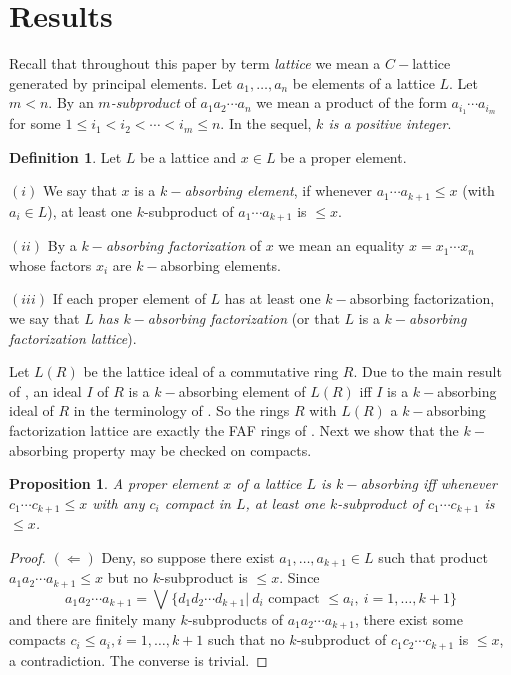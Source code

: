 \documentclass{amsart}
\theoremstyle{plain}
\newtheorem{proposition}[theorem]{Proposition}
\theoremstyle{definition}
\newtheorem{definition}[theorem]{Definition}
\theoremstyle{remark}
\begin{document}
\section{Results}



Recall that throughout this paper by term {\em lattice} we mean   a $C-$lattice generated by principal elements. 
Let $a_1, \ldots , a_{n}$ be elements of a lattice $L$.
Let $m<n$. By an {\em $m$-subproduct} of $a_1a_2\cdots a_{n}$ we mean a product of the form $a_{i_1}\cdots a_{i_m}$ for some  
$1\leq i_1< i_2< \cdots <i_m\leq n$. In the sequel, 
{\em $k$ is a positive integer}.

\begin{definition}\label{30}
Let $L$ be a lattice and $x\in L$ be a proper  element.

$(i)$ We say that $x$ is   a {\em $k-$absorbing element}, if whenever $a_1\cdots a_{k+1}\leq x$ (with  $a_i\in L$),  at least one 
$k$-subproduct of $a_1\cdots a_{k+1}$ is  $\leq x$.

$(ii)$ By a {\em $k-$absorbing factorization} of $x$ we mean an equality $x=x_1\cdots x_{n}$   whose factors $x_i$ are $k-$absorbing elements.

$(iii)$ If each proper element  of $L$ has at least one 
 $k-$absorbing factorization, we say that $L$ 
 {\em has $k-$absorbing factorization} (or that $L$ is a {\em $k-$absorbing factorization lattice}).
\end{definition}


Let $L(R)$ be the lattice ideal of a commutative ring $R$. 
Due to the main result of \cite{S}, an ideal $I$ of $R$ is a $k-$absorbing element of $L(R)$ iff $I$ is a $k-$absorbing ideal of $R$ in the terminology of \cite{AB}. So the rings $R$ with $L(R)$ a $k-$absorbing factorization lattice are exactly the FAF rings  of \cite{ADK}.
Next we show that  the $k-$absorbing property may be checked on compacts.




\begin{proposition}\label{1}
A proper  element  $x$ of  a lattice $L$ is  $k-$absorbing  iff whenever $c_1\cdots c_{k+1}\leq x$ with any $c_i$ compact in $L$,  
at least one $k$-subproduct of $c_1\cdots c_{k+1}$ is  $\leq x$.
\end{proposition}

\begin{proof} 
$(\Leftarrow)$ 
Deny, so suppose there exist $a_1,\ldots,a_{k+1}\in L$ such that  
product \\ $a_1a_2\cdots a_{k+1}\leq x$ but no $k$-subproduct  
 is $\leq x$. Since $$a_1a_2\cdots a_{k+1}=\bigvee \{ d_1d_2\cdots d_{k+1}|\ d_i \mbox{ compact } \leq a_i,\ i =1,\ldots,k+1\}$$
 and there are finitely many $k$-subproducts of $a_1a_2\cdots a_{k+1}$,
there exist some compacts $ c_i  \leq a_i, i=1,\ldots,k+1$ such that 
no $k$-subproduct of $c_1c_2\cdots c_{k+1}$   is $\leq x$, a contradiction.
The converse is trivial.
\end{proof}
\end{document}

